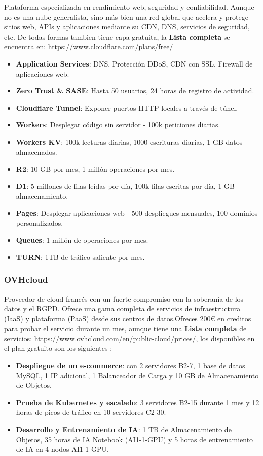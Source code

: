 Plataforma especializada en rendimiento web, seguridad y confiabilidad. Aunque no es una nube generalista, sino más bien una red global que acelera y protege sitios web, APIs y aplicaciones mediante su CDN, DNS, servicios de seguridad, etc. De todas formas tambien tiene capa gratuita, la \textbf{Lista completa} se encuentra en: \url{https://www.cloudflare.com/plans/free/}

\begin{itemize}
	\item \textbf{Application Services}: DNS, Protección DDoS, CDN con SSL, Firewall de aplicaciones web.
	\item \textbf{Zero Trust \& SASE}: Hasta 50 usuarios, 24 horas de registro de actividad.
	\item \textbf{Cloudflare Tunnel}: Exponer puertos HTTP locales a través de túnel.
	\item \textbf{Workers}: Desplegar código sin servidor - 100k peticiones diarias.
	\item \textbf{Workers KV}: 100k lecturas diarias, 1000 escrituras diarias, 1 GB datos almacenados.
	\item \textbf{R2}: 10 GB por mes, 1 millón operaciones por mes.
	\item \textbf{D1}: 5 millones de filas leídas por día, 100k filas escritas por día, 1 GB almacenamiento.
	\item \textbf{Pages}: Desplegar aplicaciones web - 500 despliegues mensuales, 100 dominios personalizados.
	\item \textbf{Queues}: 1 millón de operaciones por mes.
	\item \textbf{TURN}: 1TB de tráfico saliente por mes.
\end{itemize}

\subsubsection*{OVHcloud}

Proveedor de cloud francés con un fuerte compromiso con la soberanía de los datos y el RGPD. Ofrece una gama completa de servicios de infraestructura (IaaS) y plataforma (PaaS) desde sus centros de datos.Ofreces 200€ en creditos para probar el servicio durante un mes, aunque tiene una \textbf{Lista completa} de servicios: \url{https://www.ovhcloud.com/en/public-cloud/prices/}, los disponibles en el plan gratuito son los siguientes \citep{OVHCloudFree}:
\begin{itemize}
\item \textbf{Despliegue de un e-commerce}:
con 2 servidores B2-7, 1 base de datos MySQL, 1 IP adicional, 1 Balanceador de Carga y 10 GB de Almacenamiento de Objetos.

\item \textbf{Prueba de Kubernetes y escalado}: 3 servidores B2-15 durante 1 mes y 12 horas de picos de tráfico en 10 servidores C2-30.

\item \textbf{Desarrollo y Entrenamiento de IA}: 1 TB de Almacenamiento de Objetos, 35 horas de IA Notebook (AI1-1-GPU) y 5 horas de entrenamiento de IA en 4 nodos AI1-1-GPU.  \\
\end{itemize}


